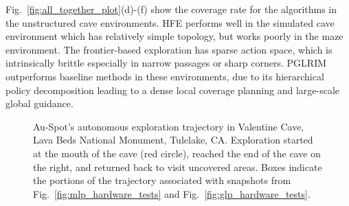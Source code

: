 \documentclass[letterpaper]{article} %
\begin{document}
Fig.~\ref{fig:all_together_plot}(d)-(f) show the coverage rate for the algorithms in the unstructured cave environments. 
HFE performs well in the simulated cave environment which has relatively simple topology, but works poorly in the maze environment.
The frontier-based exploration has sparse action space, which is intrinsically brittle especially in narrow passages or sharp corners.
PGLRIM outperforms baseline methods in these environments, due to its hierarchical policy decomposition leading to a dense local coverage planning and large-scale global guidance.

\begin{figure}[h!]
\centering
	\caption{Au-Spot's autonomous exploration trajectory in Valentine Cave, Lava Beds National Monument, Tulelake, CA. Exploration started at the mouth of the cave (red circle), reached the end of the cave on the right, and returned back to visit uncovered areas. Boxes indicate the portions of the trajectory associated with snapshots from Fig.~\ref{fig:mlp_hardware_tests} and Fig.~\ref{fig:glp_hardware_tests}.
	}
    \label{fig:lava_tube_traj}
\end{figure}
\end{document}
